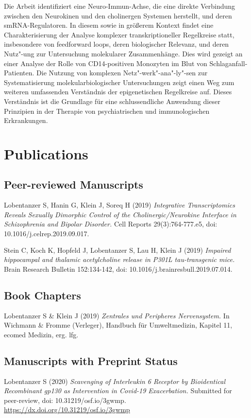 Die Arbeit identifiziert eine Neuro-Immun-Achse, die eine direkte Verbindung zwischen den Neurokinen und den cholinergen Systemen herstellt, und deren smRNA-Regulatoren. In diesem sowie in größerem Kontext findet eine Charakterisierung der Analyse komplexer transkriptioneller Regelkreise statt, insbesondere von feedforward loops, deren biologischer Relevanz, und deren Nutz"-ung zur Untersuchung molekularer Zusammenhänge. Dies wird gezeigt an einer Analyse der Rolle von CD14-positiven Monozyten im Blut von Schlaganfall-Patienten. Die Nutzung von komplexen Netz"-werk"-ana"-ly"-sen zur Systematisierung molekularbiologischer Untersuchungen zeigt einen Weg zum weiteren umfassenden Verständnis der epigenetischen Regelkreise auf. Dieses Verständnis ist die Grundlage für eine schlussendliche Anwendung dieser Prinzipien in der Therapie von psychiatrischen und immunologischen Erkrankungen.

\newpage

\section{Publications}

\subsection{Peer-reviewed Manuscripts}
\noindent Lobentanzer S, Hanin G, Klein J, Soreq H (2019) \emph{Integrative Transcriptomics Reveals Sexually Dimorphic Control of the Cholinergic/Neurokine Interface in Schizophrenia and Bipolar Disorder.} Cell Reports 29(3):764-777.e5, doi: 10.1016/j.celrep.2019.09.017.

\noindent Stein C, Koch K, Hopfeld J, Lobentanzer S, Lau H, Klein J (2019) \emph{Impaired hippocampal and thalamic acetylcholine release in P301L tau-transgenic mice.} Brain Research Bulletin 152:134-142, doi: 10.1016/j.brainresbull.2019.07.014.

\subsection{Book Chapters}
\noindent Lobentanzer S \& Klein J (2019) \emph{Zentrales und Peripheres Nervensystem.} In Wichmann \& Fromme (Verleger), Handbuch für Umweltmedizin, Kapitel 11, ecomed Medizin, erg. lfg.

\subsection{Manuscripts with Preprint Status}
\noindent Lobentanzer S (2020) \emph{Scavenging of Interleukin 6 Receptor by Bioidentical Recombinant gp130 as Intervention in Covid-19 Exacerbation.} Submitted for peer-review, doi: 10.31219/osf.io/3gwmp. \url{https://dx.doi.org/10.31219/osf.io/3gwmp}


